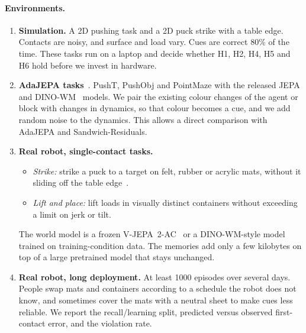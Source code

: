 \documentclass[10pt]{article}
\begin{document}
\paragraph{Environments.}
\begin{enumerate}[label=(\roman*)]
  \item \textbf{Simulation.} A 2D pushing task and a 2D puck strike with a table edge. Contacts are
  noisy, and surface and load vary. Cues are correct 80\% of the time. These tasks run on a laptop
  and decide whether H1, H2, H4, H5 and H6 hold before we invest in hardware.
  \item \textbf{AdaJEPA tasks}~\cite{wang2026adajepa}. PushT, PushObj and PointMaze with the released
  JEPA and DINO-WM~\cite{zhou2025dinowm} models. We pair the existing colour changes of the agent or
  block with changes in dynamics, so that colour becomes a cue, and we add random noise to the
  dynamics. This allows a direct comparison with AdaJEPA and Sandwich-Residuals.
  \item \textbf{Real robot, single-contact tasks.}
  \begin{itemize}
    \item \emph{Strike:} strike a puck to a target on felt, rubber or acrylic mats, without it
    sliding off the table edge~\cite{yu2016million}.
    \item \emph{Lift and place:} lift loads in visually distinct containers without exceeding a limit
    on jerk or tilt.
  \end{itemize}
  The world model is a frozen V-JEPA~2-AC~\cite{assran2025vjepa2} or a DINO-WM-style model trained on
  training-condition data. The memories add only a few kilobytes on top of a large pretrained model
  that stays unchanged.
  \item \textbf{Real robot, long deployment.} At least 1000 episodes over several days. People swap
  mats and containers according to a schedule the robot does not know, and sometimes cover the mats
  with a neutral sheet to make cues less reliable. We report the recall/learning split, predicted
  versus observed first-contact error, and the violation rate.
\end{enumerate}
\end{document}
